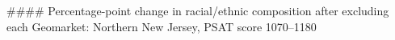 #### Percentage-point change in racial/ethnic composition after excluding each Geomarket: Northern New Jersey, PSAT score 1070–1180
